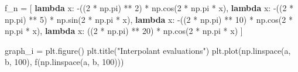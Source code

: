 \documentclass[
]{article}
\newenvironment{Shaded}{}{}
\newcommand{\DecValTok}[1]{\textcolor[rgb]{0.25,0.63,0.44}{#1}}
\newcommand{\KeywordTok}[1]{\textcolor[rgb]{0.00,0.44,0.13}{\textbf{#1}}}
\newcommand{\NormalTok}[1]{#1}
\newcommand{\OperatorTok}[1]{\textcolor[rgb]{0.40,0.40,0.40}{#1}}
\newcommand{\StringTok}[1]{\textcolor[rgb]{0.25,0.44,0.63}{#1}}
\begin{document}
\begin{Shaded}
\begin{Highlighting}[]
\NormalTok{f\_n }\OperatorTok{=}\NormalTok{ [}
    \KeywordTok{lambda}\NormalTok{ x: }\OperatorTok{{-}}\NormalTok{((}\DecValTok{2} \OperatorTok{*}\NormalTok{ np.pi) }\OperatorTok{**} \DecValTok{2}\NormalTok{) }\OperatorTok{*}\NormalTok{ np.cos(}\DecValTok{2} \OperatorTok{*}\NormalTok{ np.pi }\OperatorTok{*}\NormalTok{ x),}
    \KeywordTok{lambda}\NormalTok{ x: }\OperatorTok{{-}}\NormalTok{((}\DecValTok{2} \OperatorTok{*}\NormalTok{ np.pi) }\OperatorTok{**} \DecValTok{5}\NormalTok{) }\OperatorTok{*}\NormalTok{ np.sin(}\DecValTok{2} \OperatorTok{*}\NormalTok{ np.pi }\OperatorTok{*}\NormalTok{ x),}
    \KeywordTok{lambda}\NormalTok{ x: }\OperatorTok{{-}}\NormalTok{((}\DecValTok{2} \OperatorTok{*}\NormalTok{ np.pi) }\OperatorTok{**} \DecValTok{10}\NormalTok{) }\OperatorTok{*}\NormalTok{ np.cos(}\DecValTok{2} \OperatorTok{*}\NormalTok{ np.pi }\OperatorTok{*}\NormalTok{ x),}
    \KeywordTok{lambda}\NormalTok{ x: ((}\DecValTok{2} \OperatorTok{*}\NormalTok{ np.pi) }\OperatorTok{**} \DecValTok{20}\NormalTok{) }\OperatorTok{*}\NormalTok{ np.cos(}\DecValTok{2} \OperatorTok{*}\NormalTok{ np.pi }\OperatorTok{*}\NormalTok{ x)}
\NormalTok{]}

\NormalTok{graph\_i }\OperatorTok{=}\NormalTok{ plt.figure()}
\NormalTok{plt.title(}\StringTok{"Interpolant evaluations"}\NormalTok{)}
\NormalTok{plt.plot(np.linspace(a, b, }\DecValTok{100}\NormalTok{), f(np.linspace(a, b, }\DecValTok{100}\NormalTok{)))}
\end{Highlighting}
\end{Shaded}
\end{document}
